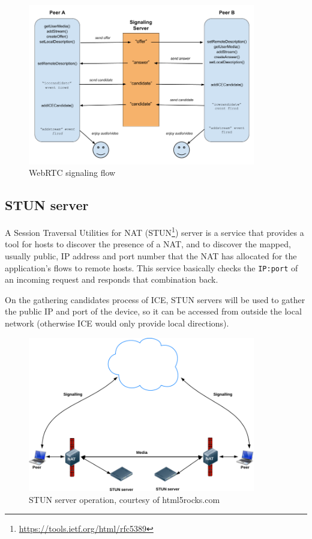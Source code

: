 \documentclass[paper=a4, fontsize=11pt]{scrartcl} %
\numberwithin{equation}{section} %
\numberwithin{figure}{section} %
\numberwithin{table}{section} %
\begin{document}
\begin{figure}[ht!]
	\centering
	\includegraphics[width=375px]{signaling.png}
	\caption{WebRTC signaling flow}
\end{figure}

\subsection{STUN server}

A Session Traversal Utilities for NAT (STUN\footnote{\url{https://tools.ietf.org/html/rfc5389}}) server is a service that provides a tool for hosts to discover the presence of a NAT, and to discover the mapped, usually public, IP address and port number that the NAT has allocated for the application's flows to remote hosts. This service basically checks the \verb|IP:port| of an incoming request and responds that combination back.

On the gathering candidates process of ICE, STUN servers will be used to gather the public IP and port of the device, so it can be accessed from outside the local network (otherwise ICE would only provide local directions).

\begin{figure}[ht!]
	\centering
	\includegraphics[width=375px]{stun.png}
	\caption{STUN server operation, courtesy of html5rocks.com}
\end{figure}
\end{document}
